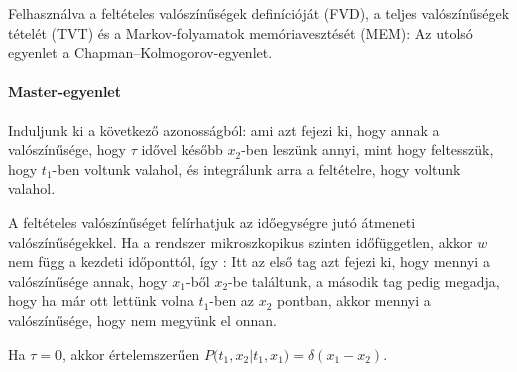    Felhasználva a feltételes valószínűségek definícióját (FVD), a teljes valószínűségek tételét (TVT) és a Markov-folyamatok memóriavesztését (MEM):
   Az utolsó egyenlet a Chapman--Kolmogorov-egyenlet. 
   
   \paragraph{Master-egyenlet}
    
    Induljunk ki a következő azonosságból:
    ami azt fejezi ki, hogy annak a valószínűsége, hogy $\tau$ idővel később $x_2$-ben leszünk annyi, mint hogy feltesszük, hogy $t_1$-ben voltunk valahol, és integrálunk arra a feltételre, hogy voltunk valahol. 
    
    A feltételes valószínűséget felírhatjuk az időegységre jutó átmeneti valószínűségekkel.
   Ha a rendszer mikroszkopikus szinten időfüggetlen, akkor $w$ nem függ a kezdeti időponttól, így :
    Itt az első tag azt fejezi ki, hogy mennyi a valószínűsége annak, hogy $x_1$-ből $x_2$-be találtunk, a második tag pedig megadja, hogy ha már ott lettünk volna $t_1$-ben az $x_2$ pontban, akkor mennyi a valószínűsége, hogy nem megyünk el onnan.
    
    Ha $\tau=0$, akkor értelemszerűen $P\big(t_1,x_2|t_1,x_1\big)=\delta(x_1-x_2)$.
    
